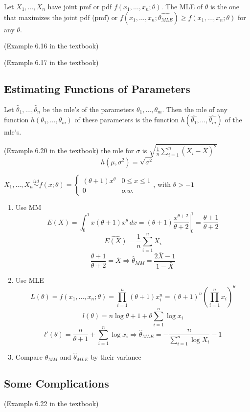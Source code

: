 \begin{defn}
Let $X_1,\dots,X_n$ have joint pmf or pdf $f(x_1,\dots,x_n;\theta)$. The MLE of $\theta$ is the one that maximizes the joint pdf (pmf) or $f(x_1,\dots,x_n;\hat{\theta_{MLE}})\geq f(x_1,\dots,x_n;\theta)$ for any $\theta$.
\end{defn}

\begin{exmp}
(Example 6.16 in the textbook)
\end{exmp}

\begin{exmp}
(Example 6.17 in the textbook)
\end{exmp}

\subsection{Estimating Functions of Parameters}
\begin{prop}
Let $\hat{\theta}_1,\dots,\hat{\theta}_n$ be the mle’s of the parameters $\theta_1,\dots,\theta_m$. Then the mle of any function $h(\theta_1,\dots,\theta_m)$ of these parameters is the function $h(\hat{\theta_1},\dots,\hat{\theta_m})$ of the mle’s.
\end{prop}

\begin{exmp}
(Example 6.20 in the textbook)
the mle for $\sigma$ is $\sqrt{\frac{1}{n} \sum_{i=1}^n (X_i -\bar{X})^2 } $
\[h(\mu,\sigma^2)=\sqrt{\sigma^2}\]
\end{exmp}

\begin{exmp}
$X_1,\dots,X_n \overset{iid}{\sim} f(x;\theta)=\begin{cases}
(\theta+1)x^{\theta} & 0 \leq x \leq 1 \\
0 & o.w.
\end{cases}$, with $\theta>-1$
\begin{enumerate}
\item Use MM
\[E(X)=\int_0^1 x(\theta+1)x^{\theta} \,dx= (\theta+1)\left.\frac{x^{\theta+2}}{\theta+2}\right|_0^1 =\frac{\theta+1}{\theta+2}\]
\[\hat{E(X)}=\frac{1}{n}\sum_{i=1}^n X_i\]
\[\frac{\theta+1}{\theta+2}=\bar{X} \Rightarrow \hat{\theta}_{MM}=\frac{2\bar{X}-1}{1-\bar{X}}\]
\item Use MLE
\[L(\theta)=f(x_1,\dots,x_n;\theta)=\prod_{i=1}^n (\theta+1)x_i^n=(\theta+1)^n \left(\prod_{i=1}^n x_i\right)^{\theta}\]
\[l(\theta)=n\log{\theta+1}+\theta \sum_{i=1}^n \log{x_i}\]
\[l'(\theta)=\frac{n}{\theta+1}+\sum_{i=1}^n \log{x_i} \Rightarrow \hat{\theta}_{MLE}=-\frac{n}{\sum_{i=1}^n \log{X_i}}-1\]
\item Compare $\hat{\theta}_{MM}$ and $\hat{\theta}_{MLE}$ by their variance
\end{enumerate}
\end{exmp}

\subsection{Some Complications}
\begin{exmp}
(Example 6.22 in the textbook)
\end{exmp}